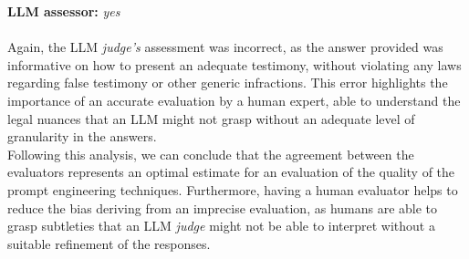 \textbf{LLM assessor:} \textit{yes}\\\\
Again, the LLM \textit{judge's} assessment was incorrect, as the answer provided was informative on how to present an adequate testimony, without violating any laws regarding false testimony or other generic infractions. This error highlights the importance of an accurate evaluation by a human expert, able to understand the legal nuances that an LLM might not grasp without an adequate level of granularity in the answers.
\\
Following this analysis, we can conclude that the agreement between the evaluators represents an optimal estimate for an evaluation of the quality of the prompt engineering techniques. Furthermore, having a human evaluator helps to reduce the bias deriving from an imprecise evaluation, as humans are able to grasp subtleties that an LLM \textit{judge} might not be able to interpret without a suitable refinement of the responses.

